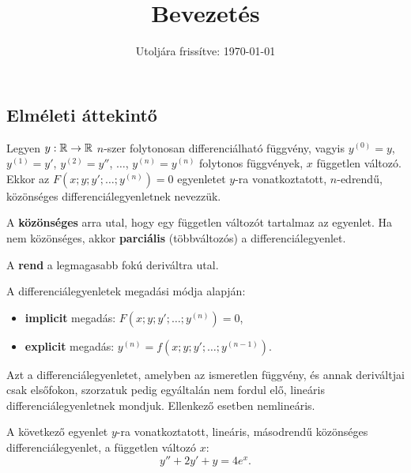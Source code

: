 \documentclass{szb-practice}
\title{Bevezetés}
\date{Utoljára frissítve: \today}
\begin{document}
\maketitle

\subsection{Elméleti áttekintő}

\begin{definition}[Differenciálegyenlet]
  Legyen $y : \mathbb{R} \rightarrow \mathbb{R}$ $n$-szer folytonosan differenciálható
  függvény, vagyis $y^{(0)} = y$, $y^{(1)} = y'$, $y^{(2)} = y''$, $\dots$,
  $y^{(n)} = y^{(n)}$ folytonos függvények, $x$ független változó. Ekkor az
  $F \left( x ; y ; y' ; \dots ; y^{(n)} \right) = 0$ egyenletet $y$-ra
  vonatkoztatott, $n$-edrendű, közönséges differenciálegyenletnek nevezzük.
\end{definition}

\begin{note}
  A \textbf{közönséges} arra utal, hogy egy független változót tartalmaz az
  egyenlet. Ha nem közönséges, akkor \textbf{parciális} (többváltozós) a
  differenciálegyenlet.

  A \textbf{rend} a legmagasabb fokú deriváltra utal.

  A differenciálegyenletek megadási módja alapján:
  \begin{itemize}
    \item \textbf{implicit} megadás:
          $F \left( x ; y ; y' ; \dots ; y^{(n)} \right) = 0$,

    \item \textbf{explicit} megadás:
          $y^{(n)} = f(x; y; y'; \dots; y^{(n-1)})$.
  \end{itemize}
\end{note}

\begin{definition}
  Azt a differenciálegyenletet, amelyben az ismeretlen függvény, és annak
  deriváltjai csak elsőfokon, szorzatuk pedig egyáltalán nem fordul elő,
  lineáris differenciálegyenletnek mondjuk. Ellenkező esetben nemlineáris.
\end{definition}

\begin{example}
  A következő egyenlet $y$-ra vonatkoztatott, lineáris, másodrendű közönséges
  differenciálegyenlet, a független változó $x$:
  $$
    y'' + 2y' + y = 4e^x.
  $$
\end{example}
\end{document}
